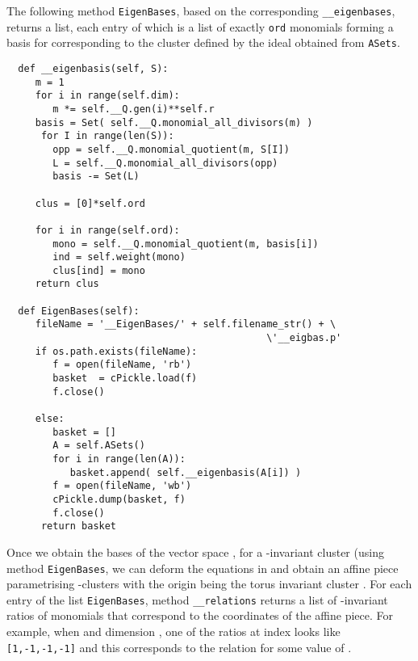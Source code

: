 \vspace{5pt}

\noindent The following method \texttt{EigenBases}, based on the corresponding \texttt{\_\_eigenbases}, returns a list, each entry of which is a list of exactly \texttt{ord} monomials forming a basis for  corresponding to the cluster  defined by the ideal  obtained from \texttt{ASets}.

\singlespacing
\begin{verbatim}
  def __eigenbasis(self, S):
     m = 1
     for i in range(self.dim):
        m *= self.__Q.gen(i)**self.r
     basis = Set( self.__Q.monomial_all_divisors(m) )
      for I in range(len(S)):
        opp = self.__Q.monomial_quotient(m, S[I])
        L = self.__Q.monomial_all_divisors(opp)
        basis -= Set(L)

     clus = [0]*self.ord

     for i in range(self.ord):
        mono = self.__Q.monomial_quotient(m, basis[i])
        ind = self.weight(mono)
        clus[ind] = mono
     return clus

  def EigenBases(self):
     fileName = '__EigenBases/' + self.filename_str() + \
                                             \'__eigbas.p'
     if os.path.exists(fileName): 
        f = open(fileName, 'rb')
        basket  = cPickle.load(f)
        f.close()

     else:
        basket = []
        A = self.ASets()
        for i in range(len(A)):
           basket.append( self.__eigenbasis(A[i]) )
        f = open(fileName, 'wb')
        cPickle.dump(basket, f)
        f.close()     
      return basket
\end{verbatim}

\vspace{5pt}

\noindent Once we obtain the bases of the vector space , for a -invariant cluster  (using method \texttt{EigenBases}, we can deform the equations in  and obtain an affine piece parametrising -clusters with the origin being the torus invariant cluster . 
For each entry of the list \texttt{EigenBases}, method \texttt{\_\_relations} returns a list of \LM{G}-invariant ratios of monomials that correspond to the coordinates of the affine piece. For example, when \LM{r = 3} and dimension \LM{n = 4}, one of the ratios at index \LM{1} looks like \texttt{[1,-1,-1,-1]} and this corresponds to the relation  for some value of \LM{\lambda \in \CC}.

